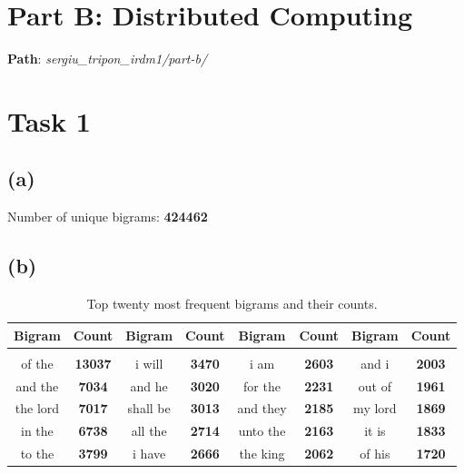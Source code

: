 \documentclass{article} %
\begin{document}
\section*{Part B: Distributed Computing}

\textbf{Path}: \textit{sergiu\_tripon\_irdm1/part-b/}

\section*{Task 1}

\subsection*{(a)}

Number of unique bigrams: \textbf{424462}

\subsection*{(b)}

\begin{table}[!htbp]
\caption{Top twenty most frequent bigrams and their counts.}
\label{table:1}
\begin{center}
\begin{tabular}{c c c c c c c c}
\multicolumn{1}{c}{\bf Bigram} & \multicolumn{1}{c}{\bf Count} & \multicolumn{1}{c}{\bf Bigram} & \multicolumn{1}{c}{\bf Count} &
\multicolumn{1}{c}{\bf Bigram} & \multicolumn{1}{c}{\bf Count} & 
\multicolumn{1}{c}{\bf Bigram} & \multicolumn{1}{c}{\bf Count}
\\ \hline \\
of the & \textbf{13037} & i will & \textbf{3470} & i am & \textbf{2603} & and i & \textbf{2003}\\

and the  & \textbf{7034}  & and he   & \textbf{3020} & for the  & \textbf{2231} & out of   & \textbf{1961}\\

the lord & \textbf{7017}  & shall be & \textbf{3013} & and they & \textbf{2185} & my lord  & \textbf{1869}\\

in the   & \textbf{6738}  & all the  & \textbf{2714} & unto the & \textbf{2163} & it is    & \textbf{1833}\\

to the   & \textbf{3799}  & i have   & \textbf{2666} & the king & \textbf{2062} & of his   & \textbf{1720}\\


\end{tabular}
\end{center}
\end{table}
\end{document}
